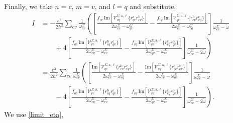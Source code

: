 Finally, we take $n = c$, $m = v$, and $l = q$ and substitute,
\begin{align*}
I &= -\frac{e^3}{2\hbar^2}\sum_{cv}\frac{1}{\omega^\Sigma_{cv}}
  \left(\left[
  \frac{f_{vc}\,\mathrm{Im}\left[\mathcal{V}^{\Sigma,\text{a},\ell}_{vq}
        \{r^{\text{c}}_{qc}
        r^{\text{b}}_{cv}\}\right]}
        {2\omega^\Sigma_{cv}-\omega^\Sigma_{qv}}
 -\frac{f_{vc}\,\mathrm{Im}\left[\mathcal{V}^{\Sigma,\text{a},\ell}_{qc}
        \{r^{\text{b}}_{cv}
        r^{\text{c}}_{vq}\}\right]}
        {2\omega^\Sigma_{cv}-\omega^\Sigma_{cq}}
\right]\frac{1}{\omega^\Sigma_{cv}-\tilde\omega}\right.\nonumber\\
&\qquad
+4\left.\left[
  \frac{f_{qc}\,\mathrm{Im}\left[\mathcal{V}^{\Sigma,\text{a},\ell}_{vc}
        \{r^{\text{b}}_{cq}
        r^{\text{c}}_{qv}\}\right]}
        {2\omega^\Sigma_{cq}-\omega^\Sigma_{cv}}
 -\frac{f_{vq}\,\mathrm{Im}\left[\mathcal{V}^{\Sigma,\text{a},\ell}_{vc}
        \{r^{\text{c}}_{cq}
        r^{\text{b}}_{qv}\}\right]}
        {2\omega^\Sigma_{qv}-\omega^\Sigma_{cv}}
\right]\frac{1}{\omega^\Sigma_{cv}-2\tilde\omega}\right)\nonumber\\
&= \frac{e^3}{2\hbar^2}\sum_{cv}\frac{1}{\omega^\Sigma_{cv}}
\left(\left[
 \frac{\mathrm{Im}\left[\mathcal{V}^{\Sigma,\text{a},\ell}_{qc}
        \{r^{\text{b}}_{cv}
        r^{\text{c}}_{vq}\}\right]}
        {2\omega^\Sigma_{cv}-\omega^\Sigma_{cq}}
 -\frac{\mathrm{Im}\left[\mathcal{V}^{\Sigma,\text{a},\ell}_{vq}
        \{r^{\text{c}}_{qc}
        r^{\text{b}}_{cv}\}\right]}
        {2\omega^\Sigma_{cv}-\omega^\Sigma_{qv}}
\right]\frac{1}{\omega^\Sigma_{cv}-\tilde\omega}\right.\nonumber\\
&\qquad-4
\left.\left[
  \frac{f_{qc}\,\mathrm{Im}\left[\mathcal{V}^{\Sigma,\text{a},\ell}_{vc}
        \{r^{\text{b}}_{cq}
        r^{\text{c}}_{qv}\}\right]}
        {2\omega^\Sigma_{cq}-\omega^\Sigma_{cv}}
 -\frac{f_{vq}\,\mathrm{Im}\left[\mathcal{V}^{\Sigma,\text{a},\ell}_{vc}
        \{r^{\text{c}}_{cq}
        r^{\text{b}}_{qv}\}\right]}
        {2\omega^\Sigma_{qv}-\omega^\Sigma_{cv}}
\right]\frac{1}{\omega^\Sigma_{cv}-2\tilde\omega}\right).
\end{align*}
We use \eqref{limit_eta},
